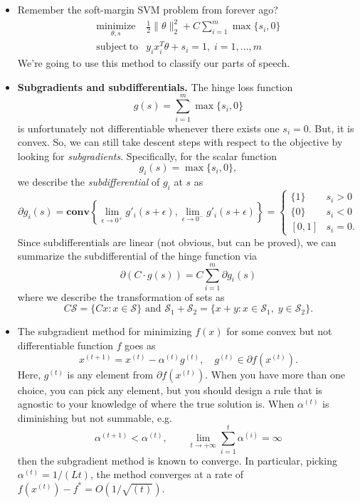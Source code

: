 \documentclass{article}
\newcommand{\minimize}[1]{\underset{#1}{\text{minimize}}}
\newcommand{\mS}{\mathcal S}
\newcommand{\conv}{\mathbf{conv}}
\newcommand{\subjto}{\mathrm{subject~to}}
\begin{document}
\begin{itemize}

\item 
Remember the soft-margin SVM problem from forever ago?
\begin{equation}
\begin{array}{ll}
\minimize{\theta,s}  & \displaystyle \tfrac{1}{2} \|\theta\|_2^2 + C \sum_{i=1}^m \max\{s_i,0\}\\
\subjto & y_ix_i^T\theta  + s_i = 1,\;  i = 1,...,m
\end{array}
\label{eq:svmprimal1}
\end{equation}
We're going to use this method to classify our parts of speech.


\item \textbf{Subgradients and subdifferentials.} The hinge loss function 
\[
g(s) = \sum_{i=1}^m \max\{s_i,0\}
\]
is unfortunately not differentiable whenever there exists one $s_i = 0$. But, it is convex. So, we can still take descent steps with respect to the objective by looking for \emph{subgradients}. 
Specifically, for the scalar function 
\[
g_i(s) = \max\{s_i,0\},
\]
we describe the \emph{subdifferential} of $g_i$ at $s$ as 
\[
\partial g_i(s) = \conv\left\{\lim_{\epsilon\to 0^+} g'_i(s+\epsilon),\lim_{\epsilon\to 0^-} g'_i(s+\epsilon)\right\} = 
\begin{cases}
\{1\} & s_i > 0\\
\{0\} & s_i < 0\\
[0,1] & s_i = 0.
\end{cases}
\]
Since subdifferentials are linear (not obvious, but can be proved), we can summarize the subdifferential of the hinge function via 
\[
\partial (C\cdot g(s)) = C\sum_{i=1}^m \partial g_i(s)
\]
where we describe the transformation of sets as 
\[
C\mS = \{Cx : x\in \mS\} \text{ and } \mS_1 + \mS_2 = \{x+y : x\in \mS_1, \; y \in \mS_2\}.
\]

\item
The subgradient method for minimizing $f(x)$ for some convex but not differentiable function $f$ goes as 
\[
x^{(t+1)} = x^{(t)} - \alpha^{(t)} g^{(t)}, \quad g^{(t)}\in \partial f(x^{(t)}).
\]
Here, $g^{(t)}$ is any element from $\partial f(x^{(t)})$. When you have more than one choice, you can pick any element, but you should design a rule that is agnostic to your knowledge of where the true solution is. When $\alpha^{(t)}$ is diminishing but not summable, e.g. 
\[
\alpha^{(t+1)} < \alpha^{(t)}, \qquad \lim_{t\to +\infty} \sum_{i=1}^t \alpha^{(i)} = \infty
\]
then the subgradient method is known to converge. In particular, picking $\alpha^{(t)} = 1/(Lt)$, the method converges at a rate of  $f(x^{(t)}) - f^* = O(1/\sqrt{(t)})$.



\end{itemize}
\end{document}
